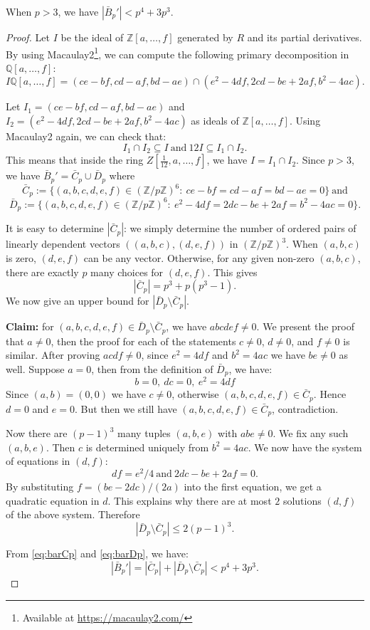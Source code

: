 \documentclass[10pt,a4paper]{amsart}
\newcommand{\Q}{\mathbb{Q}}
\newcommand{\Z}{\mathbb{Z}}
\begin{document}
\begin{proposition}\label{prop:barBp'}
    When $p>3$, we have $|\bar{B}_p'|<p^4+3p^3$.
\end{proposition}

\begin{proof}
    Let $I$ be the ideal of $\Z[a,\ldots,f]$ generated by $R$ and its partial derivatives. By using Macaulay2\footnote{Available at \url{https://macaulay2.com/}}, we can compute the following primary decomposition in $\Q[a,\ldots,f]$:
    $$I\Q[a,\ldots,f]=(ce-bf,cd-af,bd-ae)\cap (e^2-4df,2cd-be+2af,b^2-4ac).$$

    Let $I_1=(ce-bf,cd-af,bd-ae)$ and $I_2=(e^2-4df,2cd-be+2af,b^2-4ac)$ as ideals of $\Z[a,\ldots,f]$. Using Macaulay2 again, we can check that:
    $$I_1\cap I_2\subseteq I\ \text{and}\ 12I\subseteq I_1\cap I_2.$$
    This means that inside the ring $Z[\frac{1}{12},a,\ldots,f]$, we have $I=I_1\cap I_2$. Since $p>3$, we have $\bar{B}_p'=\bar{C}_p\cup\bar{D}_p$ where
    $$\bar{C}_p:=\{(a,b,c,d,e,f)\in (\Z/p\Z)^6:\ ce-bf=cd-af=bd-ae=0\}\ \text{and}$$
    $$\bar{D}_p:=\{(a,b,c,d,e,f)\in (\Z/p\Z)^6:\ e^2-4df=2dc-be+2af=b^2-4ac=0\}.$$

    It is easy to determine $|\bar{C}_p|$: we simply determine the number of ordered pairs of linearly dependent vectors $((a,b,c),(d,e,f))$ in $(\Z/p\Z)^3$. When $(a,b,c)$ is zero, $(d,e,f)$ can be any vector. Otherwise, for any given non-zero $(a,b,c)$, there are exactly $p$ many choices for $(d,e,f)$. This gives
    \begin{equation}\label{eq:barCp}
    |\bar{C}_p|= p^3+p(p^3-1).
    \end{equation}
    We now give an upper bound for $|\bar{D}_p\setminus\bar{C}_p|$. 

    \textbf{Claim:} for $(a,b,c,d,e,f)\in \bar{D}_p\setminus\bar{C}_p$, we have $abcdef\neq 0$. We present the proof that $a\neq 0$, then the  proof for each of the statements $c\neq 0$, $d\neq 0$, and $f\neq 0$ is
    similar. After proving $acdf\neq 0$, since $e^2=4df$ and $b^2=4ac$ we have $be\neq 0$ as well.
    Suppose $a=0$, then from the definition of $\bar{D}_p$, we have:
    $$b=0,\ dc=0,\ e^2=4df$$
    Since $(a,b)=(0,0)$ we have $c\neq 0$, otherwise $(a,b,c,d,e,f)\in\bar{C}_p$. Hence $d=0$ and $e=0$. But then we still have $(a,b,c,d,e,f)\in\bar{C}_p$, contradiction.

    Now there are $(p-1)^3$ many tuples $(a,b,e)$ with $abe\neq 0$. We fix any such $(a,b,e)$. Then
    $c$ is determined uniquely from $b^2=4ac$. We now have the system of equations in $(d,f)$:
    $$df=e^2/4\ \text{and}\ 2dc-be+2af=0.$$
    By substituting $f=(be-2dc)/(2a)$ into the first equation, we get a quadratic equation in $d$. This explains why there are at most $2$ solutions $(d,f)$ of the above system.  Therefore
    \begin{equation}\label{eq:barDp}
    |\bar{D}_p\setminus\bar{C}_p|\leq 2(p-1)^3.
    \end{equation}

    From \eqref{eq:barCp} and \eqref{eq:barDp}, we have:
    $$|\bar{B}_p'|=|\bar{C}_p|+|\bar{D}_p\setminus\bar{C}_p|<p^4+3p^3.$$
    \end{proof}
\end{document}
